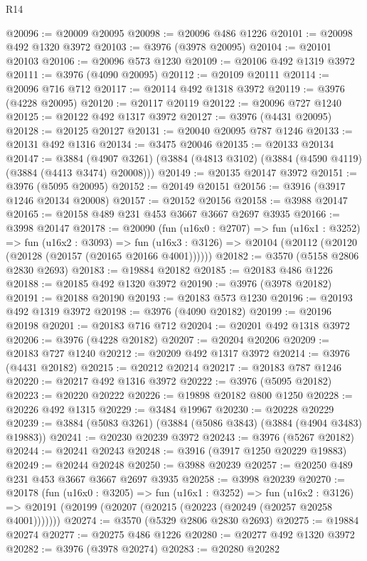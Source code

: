\begin{lexlean}{R14}
\begin{coremodule}
@20096 := @20009 @20095
@20098 := @20096 @486 @1226
@20101 := @20098 @492 @1320 @3972
@20103 := @3976 (@3978 @20095)
@20104 := @20101 @20103
@20106 := @20096 @573 @1230
@20109 := @20106 @492 @1319 @3972
@20111 := @3976 (@4090 @20095)
@20112 := @20109 @20111
@20114 := @20096 @716 @712
@20117 := @20114 @492 @1318 @3972
@20119 := @3976 (@4228 @20095)
@20120 := @20117 @20119
@20122 := @20096 @727 @1240
@20125 := @20122 @492 @1317 @3972
@20127 := @3976 (@4431 @20095)
@20128 := @20125 @20127
@20131 := @20040 @20095 @787 @1246
@20133 := @20131 @492 @1316
@20134 := @3475 @20046
@20135 := @20133 @20134
@20147 := @3884
    (@4907 @3261)
    (@3884 (@4813 @3102) (@3884 (@4590 @4119) (@3884 (@4413 @3474) @20008)))
@20149 := @20135 @20147 @3972
@20151 := @3976 (@5095 @20095)
@20152 := @20149 @20151
@20156 := @3916 (@3917 @1246 @20134 @20008)
@20157 := @20152 @20156
@20158 := @3988 @20147
@20165 := @20158 @489 @231 @453 @3667 @3667 @2697 @3935
@20166 := @3998 @20147
@20178 := @20090
    (fun (u16x0 : @2707) =>
    fun (u16x1 : @3252) =>
    fun (u16x2 : @3093) =>
    fun (u16x3 : @3126) => @20104 (@20112 (@20120 (@20128 (@20157 (@20165 @20166 @4001))))))
@20182 := @3570 (@5158 @2806 @2830 @2693)
@20183 := @19884 @20182
@20185 := @20183 @486 @1226
@20188 := @20185 @492 @1320 @3972
@20190 := @3976 (@3978 @20182)
@20191 := @20188 @20190
@20193 := @20183 @573 @1230
@20196 := @20193 @492 @1319 @3972
@20198 := @3976 (@4090 @20182)
@20199 := @20196 @20198
@20201 := @20183 @716 @712
@20204 := @20201 @492 @1318 @3972
@20206 := @3976 (@4228 @20182)
@20207 := @20204 @20206
@20209 := @20183 @727 @1240
@20212 := @20209 @492 @1317 @3972
@20214 := @3976 (@4431 @20182)
@20215 := @20212 @20214
@20217 := @20183 @787 @1246
@20220 := @20217 @492 @1316 @3972
@20222 := @3976 (@5095 @20182)
@20223 := @20220 @20222
@20226 := @19898 @20182 @800 @1250
@20228 := @20226 @492 @1315
@20229 := @3484 @19967
@20230 := @20228 @20229
@20239 := @3884 (@5083 @3261) (@3884 (@5086 @3843) (@3884 (@4904 @3483) @19883))
@20241 := @20230 @20239 @3972
@20243 := @3976 (@5267 @20182)
@20244 := @20241 @20243
@20248 := @3916 (@3917 @1250 @20229 @19883)
@20249 := @20244 @20248
@20250 := @3988 @20239
@20257 := @20250 @489 @231 @453 @3667 @3667 @2697 @3935
@20258 := @3998 @20239
@20270 := @20178
    (fun (u16x0 : @3205) =>
    fun (u16x1 : @3252) =>
    fun (u16x2 : @3126) =>
    @20191 (@20199 (@20207 (@20215 (@20223 (@20249 (@20257 @20258 @4001)))))))
@20274 := @3570 (@5329 @2806 @2830 @2693)
@20275 := @19884 @20274
@20277 := @20275 @486 @1226
@20280 := @20277 @492 @1320 @3972
@20282 := @3976 (@3978 @20274)
@20283 := @20280 @20282

\end{coremodule}
\end{lexlean}
